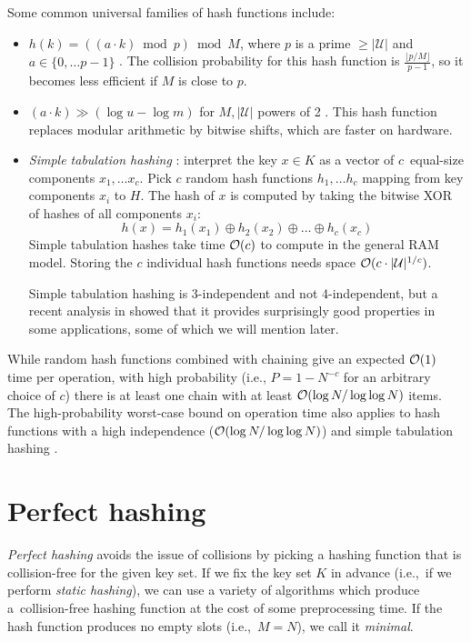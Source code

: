 Some common universal families of hash functions include:
\begin{itemize}
\item $h(k)=((a\cdot k)\bmod p)\bmod M$, where $p$ is a prime
	$\geq|\mathcal{U}|$ and $a\in\{0,\ldots p-1\}$ \cite{univ-classes}.
	The collision probability for this hash function is
	$\frac{\lfloor p/M\rfloor}{p-1}$, so it becomes less efficient
	if $M$ is close to $p$.
\item $(a\cdot k)\gg(\log u-\log m)$ for $M, |\mathcal{U}|$ powers of 2
	\cite{dietzfelbinger}.
	This hash function replaces modular arithmetic by bitwise shifts,
	which are faster on hardware.
\item \emph{Simple tabulation hashing} \cite{univ-classes}:
	interpret the key $x\in K$ as a vector
	of $c$~equal-size components $x_1,\ldots x_c$. Pick $c$ random hash
	functions $h_1,\ldots h_c$ mapping from key components $x_i$ to $H$.
	The hash of $x$ is computed by taking the bitwise XOR
	of hashes of all components $x_i$:
	$$h(x)=h_1(x_1)\oplus h_2(x_2)\oplus \ldots \oplus h_c(x_c)$$
	Simple tabulation hashes take time $\mathcal{O}(c)$ to compute in the general RAM
	model. Storing the $c$ individual hash functions needs space
	$\mathcal{O}(c\cdot |\mathcal{U}|^{1/c})$.  %

	Simple tabulation hashing is 3-independent and not 4-independent,
	but a recent analysis in \cite{power-of-simple-tab} showed that
	it provides surprisingly good properties in some applications,
	some of which we will mention later.
\end{itemize}

While random hash functions combined with chaining give an expected $\mathcal{O}(1)$
time per operation, with high probability (i.e.,  $P=1-N^{-c}$ for an arbitrary
choice of $c$) there is at least one chain with at least $\mathcal{O}(\log N/\log\log N)$
items. The high-probability worst-case bound on operation time also applies
to hash functions with a high independence ($\mathcal{O}(\log N/\log\log N)$)
\cite{chernoff-hoeffding-bounds} and simple tabulation
hashing \cite{power-of-simple-tab}.

\section{Perfect hashing}
\emph{Perfect hashing} avoids the issue of collisions by picking a hashing
function that is collision-free for the given key set. If we fix the key set
$K$ in advance (i.e.,\ if we perform \emph{static hashing}), we can use
a variety of algorithms which produce a~collision-free hashing function at
the cost of some preprocessing time. If the hash function produces no empty
slots (i.e.,\ $M=N$), we call it \emph{minimal}.

